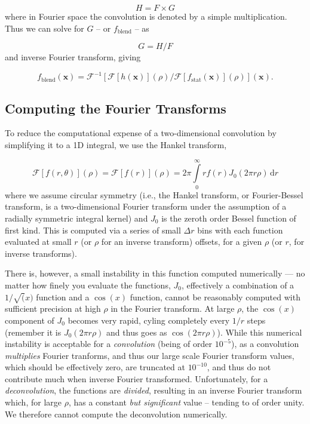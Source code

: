 \documentclass[fleqn,usenatbib]{mnras}
\begin{document}
\begin{equation}
H = F \times G
\end{equation}
where in Fourier space the convolution is denoted by a simple multiplication. Thus we can solve for $G$ -- or $f_\mathrm{blend}$ -- as

\begin{equation}
	G = H / F
\end{equation}
and inverse Fourier transform, giving

\begin{equation}
	f_\mathrm{blend}(\textbf{x}) = \mathcal{F}^{-1}\left[\mathcal{F}[h(\textbf{x})](\rho) / \mathcal{F}[f_\mathrm{stat}(\textbf{x})](\rho)\right](\textbf{x}).
\end{equation}

\subsection{Computing the Fourier Transforms}

To reduce the computational expense of a two-dimensional convolution by simplifying it to a 1D integral, we use the Hankel transform,

\begin{equation}
\mathcal{F}[f(r, \theta)](\rho) = \mathcal{F}[f(r)](\rho) = 2 \pi \int\limits_0^\infty\!r f(r) J_0(2 \pi r \rho)\,\mathrm{d}r
\end{equation}
where we assume circular symmetry (i.e., the Hankel transform, or Fourier-Bessel transform, is a two-dimensional Fourier transform under the assumption of a radially symmetric integral kernel) and $J_0$ is the zeroth order Bessel function of first kind. This is computed via a series of small $\Delta r$ bins with each function evaluated at small $r$ (or $\rho$ for an inverse transform) offsets, for a given $\rho$ (or $r$, for inverse transforms).

There is, however, a small instability in this function computed numerically --- no matter how finely you evaluate the functions, $J_0$, effectively a combination of a $1/\sqrt(x)$ function and a $\cos(x)$ function, cannot be reasonably computed with sufficient precision at high $\rho$ in the Fourier transform. At large $\rho$, the $\cos(x)$ component of $J_0$ becomes very rapid, cyling completely every $1/r$ steps (remember it is $J_0(2 \pi r \rho)$ and thus goes as $\cos(2 \pi r \rho)$). While this numerical instability is acceptable for a \textit{convolution} (being of order $10^{-5}$), as a convolution \textit{multiplies} Fourier tranforms, and thus our large scale Fourier transform values, which should be effectively zero, are truncated at $10^{-10}$, and thus do not contribute much when inverse Fourier transformed. Unfortunately, for a \textit{deconvolution}, the functions are \textit{divided}, resulting in an inverse Fourier transform which, for large $\rho$, has a constant \textit{but significant} value -- tending to of order unity. We therefore cannot compute the deconvolution numerically.
\end{document}
